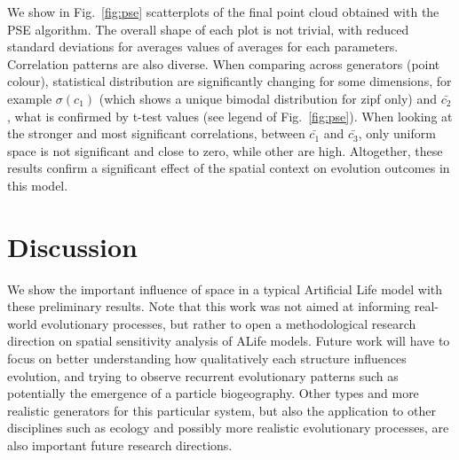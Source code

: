 \documentclass[letterpaper]{article}
\begin{document}

We show in Fig.~\ref{fig:pse} scatterplots of the final point cloud obtained with the PSE algorithm. The overall shape of each plot is not trivial, with reduced standard deviations for averages values of averages for each parameters. Correlation patterns are also diverse. When comparing across generators (point colour), statistical distribution are significantly changing for some dimensions, for example $\sigma(c_1)$ (which shows a unique bimodal distribution for zipf only) and $\bar{c_2}$, what is confirmed by t-test values (see legend of Fig.~\ref{fig:pse}). When looking at the stronger and most significant correlations, between $\bar{c_1}$ and $\bar{c_3}$, only uniform space is not significant and close to zero, while other are high.
Altogether, these results confirm a significant effect of the spatial context on evolution outcomes in this model.




\section{Discussion}


We show the important influence of space in a typical Artificial Life model with these preliminary results. Note that this work was not aimed at informing real-world evolutionary processes, but rather to open a methodological research direction on spatial sensitivity analysis of ALife models. Future work will have to focus on better understanding how qualitatively each structure influences evolution, and trying to observe recurrent evolutionary patterns such as potentially the emergence of a particle biogeography. Other types and more realistic generators for this particular system, but also the application to other disciplines such as ecology and possibly more realistic evolutionary processes, are also important future research directions.

\footnotesize

\end{document}
